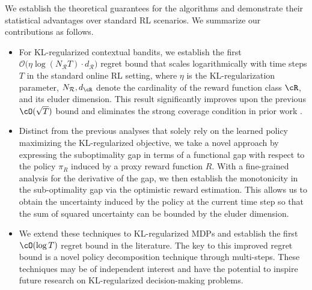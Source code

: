 \documentclass[11pt]{article}
\begin{document}
We establish the theoretical guarantees for the algorithms and demonstrate their statistical advantages over standard RL scenarios. We summarize our contributions as follows.

\begin{itemize}
    \item For KL-regularized contextual bandits, we establish the first $\mathcal{O}\big(\eta\log (N_{\mathcal R} T)\cdot d_{\mathcal R}\big)$ regret bound that scales logarithmically with time steps $T$ in the standard online RL setting, where $\eta$ is the KL-regularization parameter, $N_{\mathcal R}, d_\cR$ denote the cardinality of the reward function class $\cR$, and its eluder dimension. This result significantly improves upon the previous $\cO(\sqrt{T})$ bound \citep{xiong2024iterative} and eliminates the strong coverage condition in prior work \citep{zhao2024sharp}.
    \item Distinct from the previous analyses that solely rely on the learned policy maximizing the KL-regularized objective, we take a novel approach by expressing the suboptimality gap in terms of a functional gap with respect to the policy $\pi_R$ induced by a proxy reward function $R$. With a fine-grained analysis for the derivative of the gap, we then establish the monotonicity in the sub-optimality gap via the optimistic reward estimation. This allows us to obtain the uncertainty induced by the policy at the current time step so that the sum of squared uncertainty can be bounded by the eluder dimension.  
    \item We extend these techniques to KL-regularized MDPs and establish the first $\cO(\log T)$ regret bound in the literature. The key to this improved regret bound is a novel policy decomposition technique through multi-steps. These techniques may be of independent interest and have the potential to inspire future research on KL-regularized decision-making problems.
\end{itemize}
\end{document}
